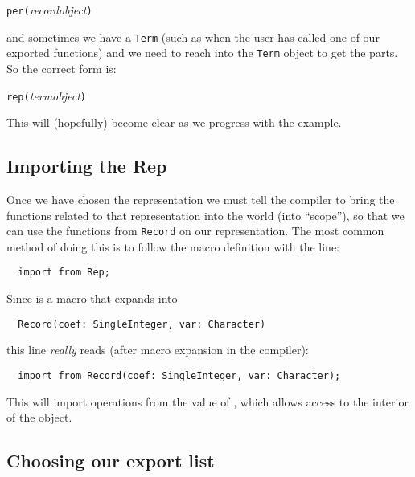 \begin{small}%
  \verb"per("{\em recordobject\/}\verb")"
\end{small}

and sometimes we have a \verb"Term" (such as when the user has called one
of our exported functions) and we need to reach into the \verb"Term" object
to get the parts. So the correct form is:

\begin{small}%
  \verb"rep("{\em termobject\/}\verb")"
\end{small}

This will (hopefully) become clear as we progress with the example.

\subsection{Importing the Rep}

Once we have chosen the representation we must tell the compiler to
bring the functions related to that representation into the world
(into ``scope''), so that we can use the functions from \verb"Record" on our
representation.  The most common method of doing this is to follow the
 macro definition with the line:

\begin{small}
\begin{verbatim}
  import from Rep;
\end{verbatim}
\end{small}

Since  is a macro that expands into 
 
\begin{small}
\begin{verbatim}
  Record(coef: SingleInteger, var: Character)
\end{verbatim}
\end{small}

this line {\em really\/} reads (after macro expansion in the compiler):

\begin{small}
\begin{verbatim}
  import from Record(coef: SingleInteger, var: Character);
\end{verbatim}
\end{small}

This will import operations from the value of , which allows
access to the interior of the object.

\subsection{ Choosing our export list}

